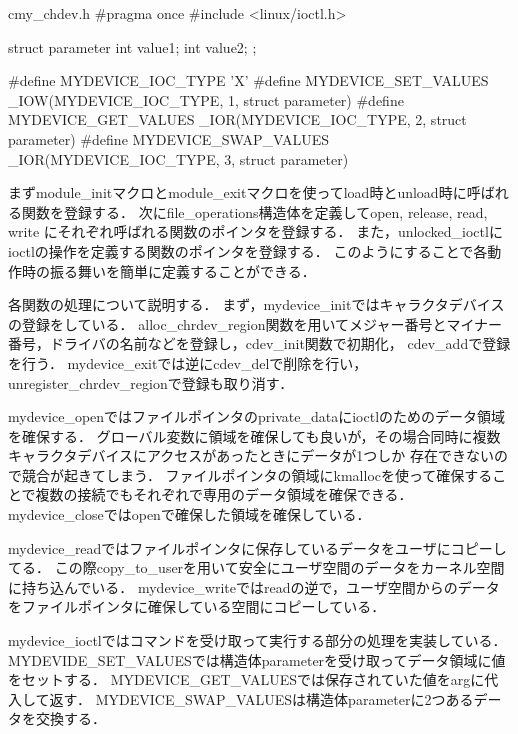 \begin{longlisting}
\begin{myminted}{c}{my\_chdev.h}
#pragma once
#include <linux/ioctl.h>

struct parameter {
    int value1;
    int value2;
};

#define MYDEVICE_IOC_TYPE 'X'
#define MYDEVICE_SET_VALUES _IOW(MYDEVICE_IOC_TYPE, 1, struct parameter)
#define MYDEVICE_GET_VALUES _IOR(MYDEVICE_IOC_TYPE, 2, struct parameter)
#define MYDEVICE_SWAP_VALUES _IOR(MYDEVICE_IOC_TYPE, 3, struct parameter)
\end{myminted}
\caption{my\_chdev.h}
\label{lst:chdevh}
\end{longlisting}

まずmodule\_initマクロとmodule\_exitマクロを使ってload時とunload時に呼ばれる関数を登録する．
次にfile\_operations構造体を定義してopen, release, read, write にそれぞれ呼ばれる関数のポインタを登録する．
また，unlocked\_ioctlにioctlの操作を定義する関数のポインタを登録する．
このようにすることで各動作時の振る舞いを簡単に定義することができる．

各関数の処理について説明する．
まず，mydevice\_initではキャラクタデバイスの登録をしている．
alloc\_chrdev\_region関数を用いてメジャー番号とマイナー番号，ドライバの名前などを登録し，cdev\_init関数で初期化，
cdev\_addで登録を行う．
mydevice\_exitでは逆にcdev\_delで削除を行い，unregister\_chrdev\_regionで登録も取り消す．

mydevice\_openではファイルポインタのprivate\_dataにioctlのためのデータ領域を確保する．
グローバル変数に領域を確保しても良いが，その場合同時に複数キャラクタデバイスにアクセスがあったときにデータが1つしか
存在できないので競合が起きてしまう．
ファイルポインタの領域にkmallocを使って確保することで複数の接続でもそれぞれで専用のデータ領域を確保できる．
mydevice\_closeではopenで確保した領域を確保している．

mydevice\_readではファイルポインタに保存しているデータをユーザにコピーしてる．
この際copy\_to\_userを用いて安全にユーザ空間のデータをカーネル空間に持ち込んでいる．
mydevice\_writeではreadの逆で，ユーザ空間からのデータをファイルポインタに確保している空間にコピーしている．

mydevice\_ioctlではコマンドを受け取って実行する部分の処理を実装している．
MYDEVIDE\_SET\_VALUESでは構造体parameterを受け取ってデータ領域に値をセットする．
MYDEVICE\_GET\_VALUESでは保存されていた値をargに代入して返す．
MYDEVICE\_SWAP\_VALUESは構造体parameterに2つあるデータを交換する．

